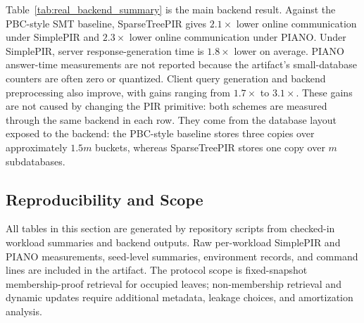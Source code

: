 \begin{table}[!t]
\centering
\caption{Repeated implementation-based backend results on real height-$128$ workloads. Each entry is a baseline/SparseTreePIR cost ratio averaged over six workloads, three seeds, and $50$ requested occupied targets per seed. Server-response gain is SimplePIR response-generation time; preprocessing gain is backend preprocessing only and excludes layout construction and metadata publication.}
\label{tab:real_backend_summary}
\scriptsize
\setlength{\tabcolsep}{3pt}
\end{table}

Table~\ref{tab:real_backend_summary} is the main backend result. Against the PBC-style SMT baseline, SparseTreePIR gives $2.1\times$ lower online communication under SimplePIR and $2.3\times$ lower online communication under PIANO. Under SimplePIR, server response-generation time is $1.8\times$ lower on average. PIANO answer-time measurements are not reported because the artifact's small-database counters are often zero or quantized. Client query generation and backend preprocessing also improve, with gains ranging from $1.7\times$ to $3.1\times$. These gains are not caused by changing the PIR primitive: both schemes are measured through the same backend in each row. They come from the database layout exposed to the backend: the PBC-style baseline stores three copies over approximately $1.5m$ buckets, whereas SparseTreePIR stores one copy over $m$ subdatabases.

\subsection{Reproducibility and Scope}

All tables in this section are generated by repository scripts from checked-in workload summaries and backend outputs. Raw per-workload SimplePIR and PIANO measurements, seed-level summaries, environment records, and command lines are included in the artifact. The protocol scope is fixed-snapshot membership-proof retrieval for occupied leaves; non-membership retrieval and dynamic updates require additional metadata, leakage choices, and amortization analysis.

